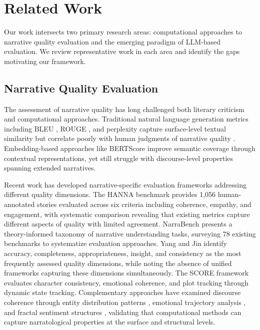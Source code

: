 \section{Related Work}
\label{sec:related}

Our work intersects two primary research areas: computational approaches to narrative quality evaluation and the emerging paradigm of LLM-based evaluation. We review representative work in each area and identify the gaps motivating our framework.

\subsection{Narrative Quality Evaluation}

The assessment of narrative quality has long challenged both literary criticism and computational approaches. Traditional natural language generation metrics including BLEU \cite{papineni2002bleu}, ROUGE \cite{lin2004rouge}, and perplexity capture surface-level textual similarity but correlate poorly with human judgments of narrative quality \cite{reiter2018structured,novikova2017we}. Embedding-based approaches like BERTScore \cite{zhang2019bertscore} improve semantic coverage through contextual representations, yet still struggle with discourse-level properties spanning extended narratives.

Recent work has developed narrative-specific evaluation frameworks addressing different quality dimensions. The HANNA benchmark \cite{chhun2022human} provides 1,056 human-annotated stories evaluated across six criteria including coherence, empathy, and engagement, with systematic comparison revealing that existing metrics capture different aspects of quality with limited agreement. NarraBench \cite{hamilton2025narrabench} presents a theory-informed taxonomy of narrative understanding tasks, surveying 78 existing benchmarks to systematize evaluation approaches. Yang and Jin \cite{yang2024makes} identify accuracy, completeness, appropriateness, insight, and consistency as the most frequently assessed quality dimensions, while noting the absence of unified frameworks capturing these dimensions simultaneously. The SCORE framework \cite{yi2025score} evaluates character consistency, emotional coherence, and plot tracking through dynamic state tracking. Complementary approaches have examined discourse coherence through entity distribution patterns \cite{barzilay2008modeling}, emotional trajectory analysis \cite{reagan2016emotional}, and fractal sentiment structures \cite{bizzoni2023fractality}, validating that computational methods can capture narratological properties at the surface and structural levels.


